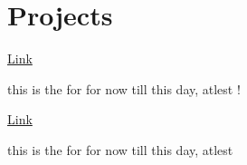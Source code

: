 \documentclass{resumecustom}%
\begin{document}
\begin{minipage}[t]{0.66\textwidth}
\section{Projects}%
%
\textbar{} \href{youtube.com}{Link}%
\vspace{\topsep}%
\begin{tightemize}%
this is the for for now till this day, atlest !%
\end{tightemize}%
\vspace{10pt}%
\sectionsep%
%
\textbar{} \href{gogole.com}{Link}%
\vspace{\topsep}%
\begin{tightemize}%
this is the for for now till this day, atlest%
\end{tightemize}%
\vspace{10pt}%
\sectionsep%
\end{minipage}%
\end{document}
